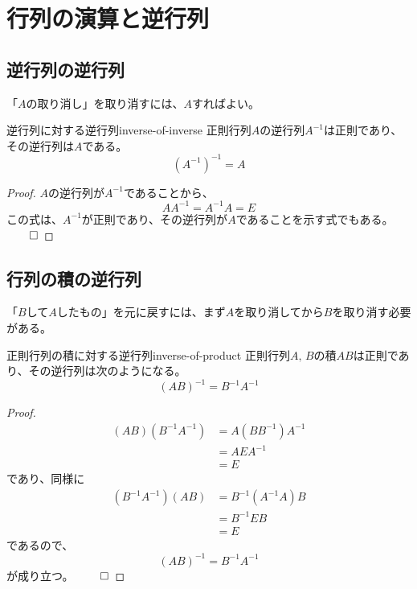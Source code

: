 \documentclass[../../../topic_linear-algebra]{subfiles}
\begin{document}
\sectionline
\section{行列の演算と逆行列}

\subsection{逆行列の逆行列}

「$A$の取り消し」を取り消すには、$A$すればよい。

\begin{theorem}{逆行列に対する逆行列}{inverse-of-inverse}
  正則行列$A$の逆行列$A^{-1}$は正則であり、その逆行列は$A$である。
  \begin{equation*}
    (A^{-1})^{-1} = A
  \end{equation*}
\end{theorem}

\begin{proof}
  $A$の逆行列が$A^{-1}$であることから、
  \begin{equation*}
    AA^{-1} = A^{-1}A = E
  \end{equation*}
  この式は、$A^{-1}$が正則であり、その逆行列が$A$であることを示す式でもある。 $\qed$
\end{proof}

\subsection{行列の積の逆行列}

「$B$して$A$したもの」を元に戻すには、まず$A$を取り消してから$B$を取り消す必要がある。

\begin{theorem}{正則行列の積に対する逆行列}{inverse-of-product}
  正則行列$A,\,B$の積$AB$は正則であり、その逆行列は次のようになる。
  \begin{equation*}
    (AB)^{-1} = B^{-1} A^{-1}
  \end{equation*}
\end{theorem}

\begin{proof}
  \begin{align*}
    (AB)(B^{-1} A^{-1}) & = A(B B^{-1}) A^{-1} \\
                        & = A E A^{-1}         \\
                        & = E
  \end{align*}
  であり、同様に
  \begin{align*}
    (B^{-1} A^{-1})(AB) & = B^{-1} (A^{-1} A) B \\
                        & = B^{-1} E B          \\
                        & = E
  \end{align*}
  であるので、
  \begin{equation*}
    (AB)^{-1} = B^{-1} A^{-1}
  \end{equation*}
  が成り立つ。 $\qed$
\end{proof}
\end{document}
